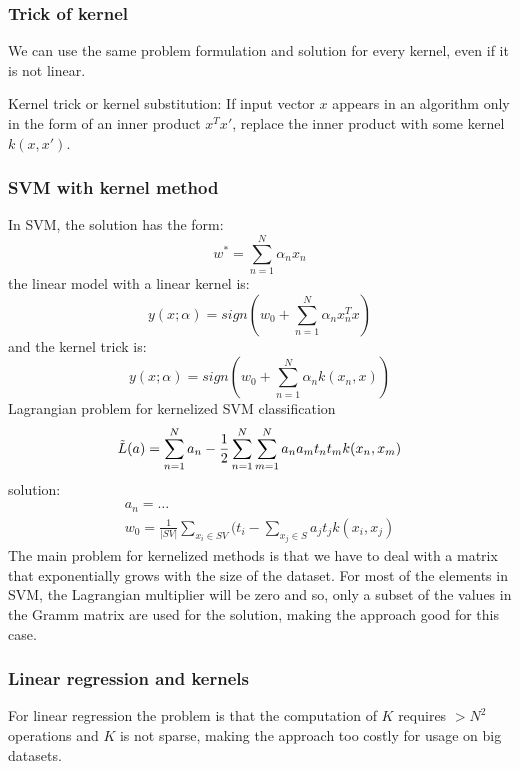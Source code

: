 \subsubsection{Trick of kernel}
We can use the same problem formulation and solution for every kernel, even if it is not linear.

Kernel trick or kernel substitution: If input vector $x$ appears in an algorithm only in the form of an inner
product $x^{T}x'$, replace the inner product with some kernel $k(x, x')$.

\subsubsection{SVM with kernel method}
In SVM, the solution has the form:
\begin{equation}
    w^{*} = \sum_{n=1}^{N} \alpha_{n}x_{n}
\end{equation}
the linear model with a linear kernel is:
\begin{equation}
    y(x; \alpha) = sign(w_{0} + \sum_{n=1}^{N} \alpha_{n} x_{n}^{T} x)
\end{equation}
and the kernel trick is:
\begin{equation}
    y(x; \alpha) = sign(w_{0} + \sum_{n=1}^{N} \alpha_{n} k(x_{n},x))
\end{equation}
Lagrangian problem for kernelized SVM classification
\begin{equation}
    \Tilde{L}(a) = \sum_{n=1}^{N}a_{n} - \frac{1}{2} \sum_{n=1}^{N}\sum_{m=1}^{N}a_{n}a_{m}t_{n}t_{m}k(x_{n},x_{m})
\end{equation}
solution:
\begin{equation}
    \begin{multlined}        
    a_{n} = \dots \\
    w_{0} = \frac{1}{|SV|} \sum_{x_{i} \in SV} (t_{i} - \sum_{x_{j} \in S} a_{j}t_{j}k(x_{i}, x_{j})
    \end{multlined}
\end{equation}
The main problem for kernelized methods is that we have to deal with a matrix that exponentially grows with the size of the dataset.
For most of the elements in SVM, the Lagrangian multiplier will be zero and so, only a subset of the values in the Gramm matrix are used for the solution, making the approach good for this case.
\subsubsection{Linear regression and kernels}
For linear regression the problem is that the computation of $K$ requires $> N^{2}$ operations and $K$ is not sparse, making the approach too costly for usage on big datasets.

